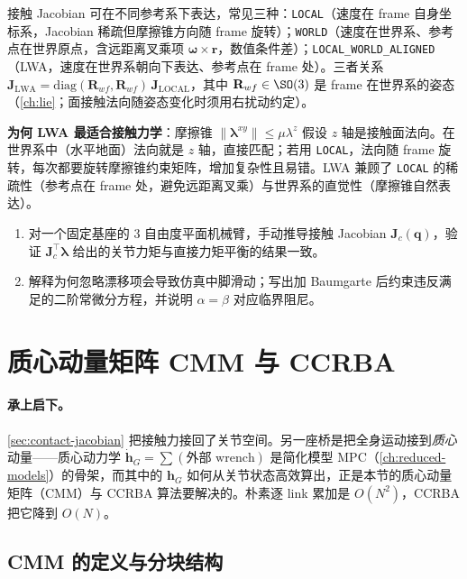 接触 Jacobian 可在不同参考系下表达，常见三种：\texttt{LOCAL}（速度在 frame 自身坐标系，Jacobian 稀疏但摩擦锥方向随 frame 旋转）；\texttt{WORLD}（速度在世界系、参考点在世界原点，含远距离叉乘项 $\boldsymbol{\omega}\times\boldsymbol{r}$，数值条件差）；\texttt{LOCAL\_WORLD\_ALIGNED}（LWA，速度在世界系朝向下表达、参考点在 frame 处）。三者关系 $\mathbf{J}_{\mathrm{LWA}}=\mathrm{diag}(\mathbf{R}_{wf},\mathbf{R}_{wf})\,\mathbf{J}_{\mathrm{LOCAL}}$，其中 $\mathbf{R}_{wf}\in\SO(3)$ 是 frame 在世界系的姿态（\cref{ch:lie}；面接触法向随姿态变化时须用右扰动约定）。

\textbf{为何 LWA 最适合接触力学}：摩擦锥 $\|\boldsymbol{\lambda}^{xy}\|\le\mu\lambda^z$ 假设 $z$ 轴是接触面法向。在世界系中（水平地面）法向就是 $z$ 轴，直接匹配；若用 \texttt{LOCAL}，法向随 frame 旋转，每次都要旋转摩擦锥约束矩阵，增加复杂性且易错。LWA 兼顾了 \texttt{LOCAL} 的稀疏性（参考点在 frame 处，避免远距离叉乘）与世界系的直觉性（摩擦锥自然表达）。

\begin{practice}
\begin{enumerate}
  \item 对一个固定基座的 3 自由度平面机械臂，手动推导接触 Jacobian $\mathbf{J}_c(\boldsymbol{q})$，验证 $\mathbf{J}_c^\top\boldsymbol{\lambda}$ 给出的关节力矩与直接力矩平衡的结果一致。
  \item 解释为何忽略漂移项会导致仿真中脚滑动；写出加 Baumgarte 后约束违反满足的二阶常微分方程，并说明 $\alpha=\beta$ 对应临界阻尼。
\end{enumerate}
\end{practice}

\section{质心动量矩阵 CMM 与 CCRBA}
\label{sec:contact-cmm}

\paragraph{承上启下。}
\cref{sec:contact-jacobian} 把接触力接回了关节空间。另一座桥是把全身运动接到\emph{质心}动量——质心动力学 $\dot{\boldsymbol{h}}_G=\sum(\text{外部 wrench})$ 是简化模型 MPC（\cref{ch:reduced-models}）的骨架，而其中的 $\boldsymbol{h}_G$ 如何从关节状态高效算出，正是本节的质心动量矩阵（CMM）与 CCRBA 算法要解决的。朴素逐 link 累加是 $O(N^2)$，CCRBA 把它降到 $O(N)$。

\subsection{CMM 的定义与分块结构}
\label{subsec:cmm-def}

